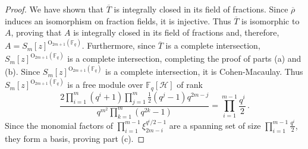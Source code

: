 \documentclass[10pt,a4paper]{amsart}
\newcommand{\field}{\mathbb{F}}
\newcommand{\orth}[2]{{{\text{O}_{{#1}}(\field_{#2})}}}
\renewcommand{\H}{\mathcal{H}}
\begin{document}
\begin{proof}
We have shown that $\overline{T}$ is integrally closed in its field of fractions.
Since $\overline{\rho}$ induces an isomorphism on fraction fields, it is injective.
Thus $\overline{T}$ is isomorphic to $A$, proving that $A$ is integrally closed in its field of fractions and, therefore,
 $A=S_m[z]^{\orth{2m+1}{q}}$. Furthermore, since $\overline{T}$ is a complete intersection, $S_m[z]^{\orth{2m+1}{q}}$ is a complete intersection,
 completing the proof of parts (a) and (b). Since $S_m[z]^{\orth{2m+1}{q}}$ is a complete intersection, it is Cohen-Macaulay. Thus 
 $S_m[z]^{\orth{2m+1}{q}}$  is a free module over $\field_q[\H]$ of rank
    $$
        \frac{2\prod_{i=1}^m(q^i+1)\prod_{j=1}^m\frac{1}{2}(q^j-1)q^{2m-j}}{q^{m^2}\prod_{k=1}^m(q^{2k}-1)}=\prod_{i=1}^{m-1}\frac{q^i}{2}\, .
    $$
Since the monomial factors of $\prod_{i=1}^{m-1} \xi_{2m-i}^{q^i/2-1}$ are a spanning set of size $\prod_{i=1}^{m-1}\frac{q^i}{2}$, they form a basis, proving part (c).
\end{proof} 
\end{document}
